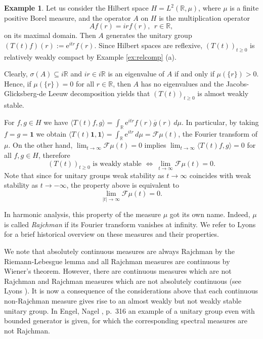 \documentclass[11pt,intlimits, draft,oneside]{amsart}
\theoremstyle{definition}
\newtheorem{example}[thm]{Example}
\newcommand\Eins{\mathbf{1}}
\def\dd{\,d}
\def\ee{\mathrm{e}}
\def\RR{\mathbb{R}}
\begin{document}
%
\begin{example} \label{example:Rajchman}
Let us consider the Hilbert space $H=L^2(\RR,\mu)$, where $\mu$ is a
finite positive Borel measure, and the operator $A$ on $H$ is the
multiplication operator
%
\begin{equation*}
Af(r) = i rf(r),\ \ r \in \RR,
\end{equation*}
%
on its maximal domain. Then $A$ generates the unitary group
$(T(t)f)(r):=\ee^{i tr}f(r)$. Since Hilbert spaces are reflexive,
$(T(t))_{t\geq 0}$ is relatively weakly compact by Example
\ref{ex:relcomp} (a).

Clearly, $\sigma(A) \subseteq i \RR$ and $i r \in i \RR$ is an
eigenvalue of $A$ if and only if $\mu(\{r\})
> 0$. Hence, if $\mu( \{r\} ) = 0$ for all $r \in \RR$, then $A$ has
no eigenvalues and the Jacobs-Glicksberg-de Leeuw decomposition
yields that $(T(t))_{t \geq 0}$ is almost weakly stable.

For $f,g \in H$ we have  $\langle T(t)f,g \rangle = \int_\RR \ee^{i
tr}f(r)\overline{g}(r) \dd \mu$. In particular, by taking $f=g=\Eins
$ we obtain $\langle T(t)\Eins,\Eins \rangle = \int_\RR \ee^{i tr}
\dd \mu = \mathcal F \mu (t)$, the Fourier transform of $\mu$. On
the other hand, $\lim_{t\to\infty}\mathcal F \mu (t)= 0$ implies
$\lim_{t\to\infty}\langle T(t)f,g \rangle= 0$ for all $f,g \in H$,
therefore
%
\begin{equation*}
(T(t))_{t\geq 0} \text{  is weakly stable  } \Longleftrightarrow \
\lim_{t\to\infty} \mathcal F \mu (t)= 0.
\end{equation*}
%
Note that since for unitary groups weak stability as $t\to \infty$
coincides with weak stability as $t\to -\infty$, the property above
is equivalent to
\begin{equation*}\lim_{|t|\to\infty} \mathcal F \mu (t)= 0.\end{equation*}


In harmonic analysis, this property of the measure $\mu$ got its own
name. Indeed,  $\mu$ is called \emph{Rajchman} if its Fourier transform
vanishes at infinity. We refer to Lyons \cite{lyons85, lyons95} for
a brief historical overview on these measures and their properties.


We note that absolutely continuous measures are always Rajchman by
the Riemann-Lebesgue lemma and all Rajchman measures are continuous
by Wiener's theorem. However, there are continuous measures which
are not Rajchman and Rajchman measures which are not absolutely
continuous (see Lyons \cite{lyons95}).
It is
now a consequence of the considerations above that each continuous
non-Rajchman measure gives rise to an almost weakly but not weakly
stable unitary group. In Engel, Nagel \cite{engel/nagel:2000}, p.~316 
an example of a unitary group even with bounded generator  
is given, for which the corresponding spectral measures are not Rajchman.
%
\end{example}
\end{document}
